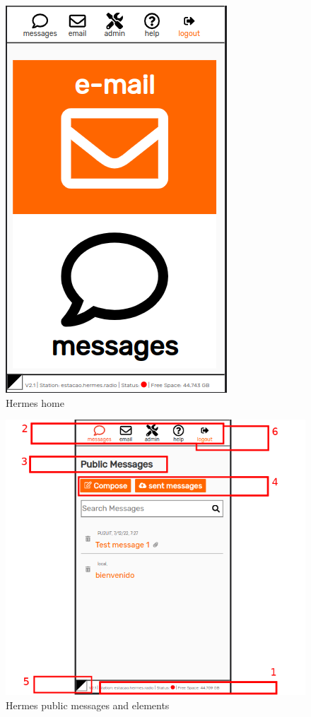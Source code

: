 \documentclass[11pt,a4paper]{article}
\begin{document}
\begin{figure}[H]
    \centering
    \includegraphics[width=0.5\columnwidth]{screenshots/frontend/en/landing.png}
    \caption{Hermes home}
    \label{fig:messagesindex}
\end{figure}

\begin{figure}[H]
    \centering
    \includegraphics[width=1\columnwidth]{screenshots/frontend/en/messagesindex_enUS.png}
    \caption{Hermes public messages and elements}
    \label{fig:messagesindex}
\end{figure}
    
\end{document}
